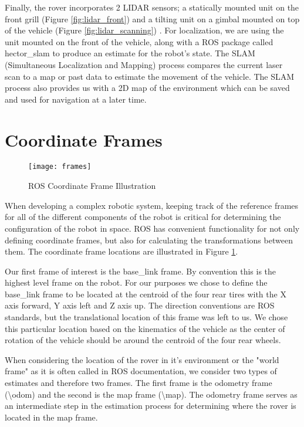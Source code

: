 Finally, the rover incorporates 2 LIDAR sensors; a statically mounted unit on the front grill (Figure \ref{fig:lidar_front}) and a tilting unit on a gimbal mounted on top of the vehicle (Figure \ref{fig:lidar_scanning}) . For localization, we are using the unit mounted on the front of the vehicle, along with a ROS package called hector\_slam to produce an estimate for the robot's state. The SLAM (Simultaneous Localization and Mapping) process compares the current laser scan to a map or past data to estimate the movement of the vehicle. The SLAM process also provides us with a 2D map of the environment which can be saved and used for navigation at a later time.

\section{Coordinate Frames}

\begin{figure}[h!]
	\centerline{\texttt{[image: frames]}}
	\caption[]{ROS Coordinate Frame Illustration}
	\label{fig:frames}
\end{figure}

When developing a complex robotic system, keeping track of the reference frames for all of the different components of the robot is critical for determining the configuration of the robot in space. ROS has convenient functionality for not only defining coordinate frames, but also for calculating the transformations between them. The coordinate frame locations are illustrated in Figure \ref{fig:frames}.

Our first frame of interest is the base\_link frame. By convention this is the highest level frame on the robot. For our purposes we chose to define the base\_link frame to be located at the centroid of the four rear tires with the X axis forward, Y axis left and Z axis up. The direction conventions are ROS standards, but the translational location of this frame was left to us. We chose this particular location based on the kinematics of the vehicle as the center of rotation of the vehicle should be around the centroid of the four rear wheels. 

When considering the location of the rover in it's environment or the "world frame" as it is often called in ROS documentation, we consider two types of estimates and therefore two frames. The first frame is the odometry frame (\textbackslash odom) and the second is the map frame (\textbackslash map). The odometry frame serves as an intermediate step in the estimation process for determining where the rover is located in the map frame.

